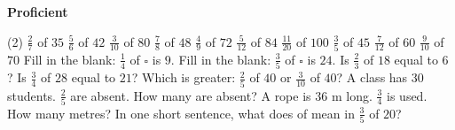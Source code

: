 \documentclass[17pt,a4paper,landscape]{extarticle}
\begin{document}
\sffamily
\boldmath

\boldmath

\vspace*{0.4em}
{\LARGE \textbf{Proficient}}
\begin{tasks}(2)
\task \mbox{$\frac{2}{7}$} of \mbox{$35$}
\task \mbox{$\frac{5}{6}$} of \mbox{$42$}
\task \mbox{$\frac{3}{10}$} of \mbox{$80$}
\task \mbox{$\frac{7}{8}$} of \mbox{$48$}
\task \mbox{$\frac{4}{9}$} of \mbox{$72$}
\task \mbox{$\frac{5}{12}$} of \mbox{$84$}
\task \mbox{$\frac{11}{20}$} of \mbox{$100$}
\task \mbox{$\frac{3}{5}$} of \mbox{$45$}
\task \mbox{$\frac{7}{12}$} of \mbox{$60$}
\task \mbox{$\frac{9}{10}$} of \mbox{$70$}
\task Fill in the blank: \mbox{$\frac{1}{4}$} of \mbox{$\square$} is \mbox{$9$}.
\task Fill in the blank: \mbox{$\frac{3}{5}$} of \mbox{$\square$} is \mbox{$24$}.
\task Is \mbox{$\frac{2}{3}$} of \mbox{$18$} equal to \mbox{$6$}?
\task Is \mbox{$\frac{3}{4}$} of \mbox{$28$} equal to \mbox{$21$}?
\task Which is greater: \mbox{$\frac{2}{5}$} of \mbox{$40$} or \mbox{$\frac{3}{10}$} of \mbox{$40$}?
\task A class has \mbox{$30$} students. \mbox{$\frac{2}{5}$} are absent. How many are absent?
\task A rope is \mbox{$36$} m long. \mbox{$\frac{3}{4}$} is used. How many metres?
\task In one short sentence, what does of mean in \mbox{$\frac{3}{5}$} of \mbox{$20$}?
\end{tasks}
\end{document}
